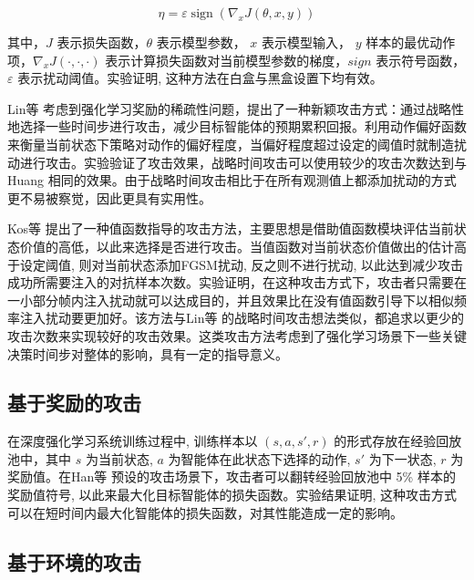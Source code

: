 \documentclass[lettersize,journal]{IEEEtran}
\begin{document}
 \begin{equation}
 	 \eta=\varepsilon \operatorname{sign}\left(\nabla_{x} J(\theta, x, y)\right)
 \end{equation}

 \quad 其中，$J$ 表示损失函数，$\theta$ 表示模型参数， $x$ 表示模型输入， $y$ 样本的最优动作项，$\nabla_{x} J(·, ·, ·)$ 表示计算损失函数对当前模型参数的梯度，$sign$ 表示符号函数，$\varepsilon$ 表示扰动阈值。实验证明, 这种方法在白盒与黑盒设置下均有效。
 
 \quad Lin等\cite{lin2017tactics} 考虑到强化学习奖励的稀疏性问题，提出了一种新颖攻击方式：通过战略性地选择一些时间步进行攻击，减少目标智能体的预期累积回报。利用动作偏好函数来衡量当前状态下策略对动作的偏好程度，当偏好程度超过设定的阈值时就制造扰动进行攻击。实验验证了攻击效果，战略时间攻击可以使用较少的攻击次数达到与Huang\cite{huang2017adversarial} 相同的效果。由于战略时间攻击相比于在所有观测值上都添加扰动的方式更不易被察觉，因此更具有实用性。
 
  \quad Kos等\cite{kos2017delving} 提出了一种值函数指导的攻击方法，主要思想是借助值函数模块评估当前状态价值的高低，以此来选择是否进行攻击。当值函数对当前状态价值做出的估计高于设定阈值, 则对当前状态添加FGSM扰动, 反之则不进行扰动, 以此达到减少攻击成功所需要注入的对抗样本次数。实验证明，在这种攻击方式下，攻击者只需要在一小部分帧内注入扰动就可以达成目的，并且效果比在没有值函数引导下以相似频率注入扰动要更加好。该方法与Lin等\cite{lin2017tactics} 的战略时间攻击想法类似，都追求以更少的攻击次数来实现较好的攻击效果。这类攻击方法考虑到了强化学习场景下一些关键决策时间步对整体的影响，具有一定的指导意义。
  
 \subsection{基于奖励的攻击}
 
 \quad 在深度强化学习系统训练过程中, 训练样本以 $(s, a, s ′ , r)$ 的形式存放在经验回放池中，其中 $s$ 为当前状态, $a$ 为智能体在此状态下选择的动作, $s'$ 为下一状态, $r$ 为奖励值。在Han等\cite{kiourti2019trojan} 预设的攻击场景下，攻击者可以翻转经验回放池中 5\% 样本的奖励值符号, 以此来最大化目标智能体的损失函数。实验结果证明, 这种攻击方式可以在短时间内最大化智能体的损失函数，对其性能造成一定的影响。
 
 
 
 \subsection{基于环境的攻击}
 
\end{document}

